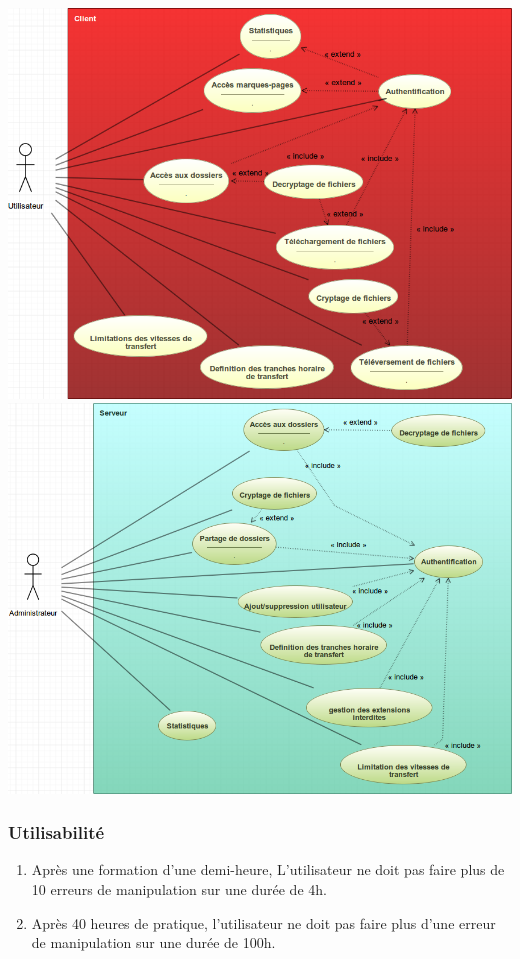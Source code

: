 \documentclass[10pt,a4paper]{report}
\begin{document}
\begin{center}
	\includegraphics[scale=0.5]{Ressources/Client.png}\\
	\includegraphics[scale=0.5]{Ressources/Serveur.png}
\end{center}


\subsubsection{Utilisabilité}
	\begin{enumerate}
		\item Après une formation d'une demi-heure, L'utilisateur ne doit pas faire plus de 10 erreurs de manipulation sur une durée de 4h.
		\item Après 40 heures de pratique, l'utilisateur ne doit pas faire plus d'une erreur de manipulation sur une durée de 100h.
	\end{enumerate}
\end{document}
